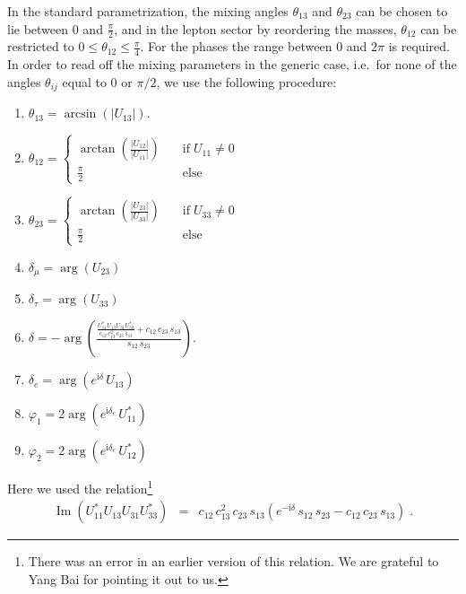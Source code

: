 \documentclass[12pt,a4paper,twoside]{scrartcl}
\DeclareMathOperator{\im}{Im}
\def\I{\mathrm{i}}
\numberwithin{equation}{section}
\numberwithin{table}{section}
\begin{document}
In the standard parametrization, the mixing angles $\theta_{13}$ 
and $\theta_{23}$ can be chosen to lie between $0$ and $\frac{\pi}{2}$,
and in the lepton sector by reordering the masses, $\theta_{12}$ can be restricted to $0\le\theta_{12}\le\frac{\pi}{4}$.
For the phases the range between $0$ and $2\pi$ is required.
In order to read off the mixing parameters in the generic case, i.e.\ for none
of the angles $\theta_{ij}$ equal to 0 or $\pi/2$, we use the following
procedure:
\begin{enumerate}
 \item $\theta_{13}=\arcsin(|U_{13}|)$.
 \item $\displaystyle \theta_{12}=\left\{\begin{array}{ll}
 \displaystyle \arctan\left(\frac{|U_{12}|}{|U_{11}|}\right) \quad
        & \text{if}\;U_{11}\ne0\\
 \frac{\pi}{2} & \text{else}
 \end{array}\right.$
 \item $\displaystyle \theta_{23}=\left\{\begin{array}{ll}
 \displaystyle \arctan\left(\frac{|U_{23}|}{|U_{33}|}\right) \quad
        & \text{if}\;U_{33}\ne0\\
 \frac{\pi}{2} & \text{else}
 \end{array}\right.$
 \item $\delta_\mu = \arg(U_{23})$
 \item $\delta_\tau = \arg(U_{33})$
 \item \label{step6}$\displaystyle\delta=
 -\arg\left(\frac{\displaystyle\frac{U_{11}^*U_{13}U_{31}U_{33}^*}
        {c_{12}\,c_{13}^2\,c_{23}\,s_{13}}
        +c_{12}\,c_{23}\,s_{13}}
        {s_{12}\,s_{23}}\right)$.
 \item $\delta_e=\arg(e^{\I\delta}\,U_{13})$
 \item $\displaystyle\varphi_1=2\arg(e^{\I\delta_e}\,U_{11}^*)$
 \item \label{step9}$\displaystyle\varphi_2=2\arg(e^{\I\delta_e}\,U_{12}^*)$
\end{enumerate}
Here we used the relation\footnote{There was an error in an earlier version of
this relation. We are grateful to Yang Bai for pointing it out to us.}
\begin{eqnarray}
 \im \left(U_{11}^*U_{13}U_{31}U_{33}^*\right)
 & = &
 c_{12}\,c_{13}^2\, 
 c_{23}\,s_{13}
 \left(e^{-\I\delta}\,s_{12}\,s_{23} - c_{12}\,c_{23}\,s_{13}\right)
 \;.\nonumber
\end{eqnarray}
\end{document}
